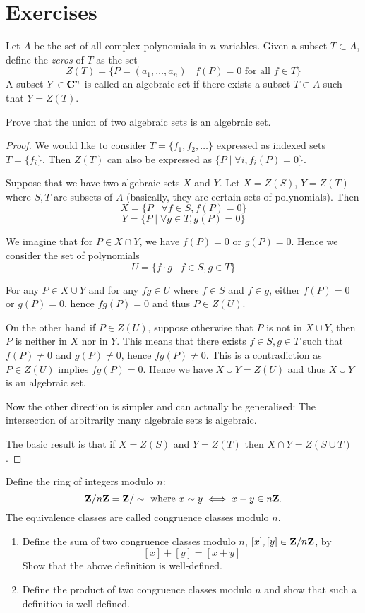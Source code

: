 \section*{Exercises}
\begin{prbm}
Let $A$ be the set of all complex polynomials in $n$ variables. Given a subset $T \subset A$, define the \textit{zeros} of $T$ as the set
\[ Z(T) = \{P=(a_1,\dots,a_n) \mid f(P)=0 \text{ for all } f \in T\} \]
A subset $Y \in \mathbf C^n$ is called an algebraic set if there exists a subset $T \subset A$ such that $Y=Z(T)$.

Prove that the union of two algebraic sets is an algebraic set.
\end{prbm}
\begin{proof}
We would like to consider $T=\{f_1, f_2, \dots\}$ expressed as indexed sets $T=\{f_i\}$. Then $Z(T)$ can also be expressed as $\{P \mid \forall i, f_i(P)=0\}$.

Suppose that we have two algebraic sets $X$ and $Y$. Let $X=Z(S)$, $Y=Z(T)$ where $S,T$ are subsets of $A$ (basically, they are certain sets of polynomials). Then
\[ X=\{P \mid \forall f \in S, f(P)=0\} \]
\[ Y=\{P \mid \forall g \in T, g(P)=0\} \]

We imagine that for $P\in X\cap Y$, we have $f(P)=0$ or $g(P)=0$. Hence we consider the set of polynomials
\[ U=\{f\cdot g \mid f\in S, g\in T\} \]

For any $P\in X\cup Y$ and for any $fg\in U$ where $f\in S$ and $f\in g$, either $f(P)=0$ or $g(P)=0$, hence $fg(P)=0$ and thus $P\in Z(U)$.

On the other hand if $P\in Z(U)$, suppose otherwise that $P$ is not in $X\cup Y$, then $P$ is neither in $X$ nor in $Y$. This means that there exists $f\in S,g\in T$ such that $f(P)\neq0$ and $g(P)\neq0$, hence $fg(P)\neq0$. This is a contradiction as $P\in Z(U)$ implies $fg(P)=0$. Hence we have $X\cup Y=Z(U)$ and thus $X\cup Y$ is an algebraic set.

Now the other direction is simpler and can actually be generalised: The intersection of arbitrarily many algebraic sets is algebraic. 

The basic result is that if $X=Z(S)$ and $Y=Z(T)$ then $X\cap Y=Z(S\cup T)$. 
\end{proof}
\pagebreak

\begin{prbm}
Define the ring of integers modulo $n$:
\[ \mathbf Z/n\mathbf Z = \mathbf Z/\sim \text{ where } x \sim y \iff x-y \in n\mathbf Z. \]
The equivalence classes are called congruence classes modulo $n$.
\begin{enumerate}[label=(\alph*)]
\item Define the sum of two congruence classes modulo $n$, $[x], [y] \in \mathbf Z/n\mathbf Z$, by
\[ [x] + [y] = [x + y] \]
Show that the above definition is well-defined.
\item Define the product of two congruence classes modulo $n$ and show that such a definition is well-defined.
\end{enumerate} 
\end{prbm}

